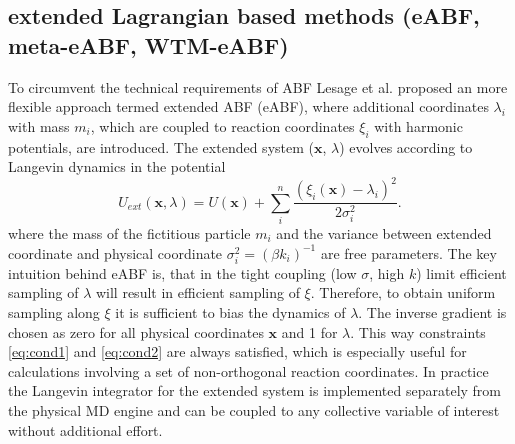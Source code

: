 \newpage
\subsection{extended Lagrangian based methods (eABF, meta-eABF, WTM-eABF)}
\label{sec:eABF}
To circumvent the technical requirements of ABF Lesage et al.\autocite{lesage2017smoothed} proposed an more flexible approach termed extended ABF (eABF), where additional coordinates $\lambda_i$ with mass $m_{i}$, which are coupled to reaction coordinates $\xi_i$ with harmonic potentials, are introduced. The extended system ($\textbf{x}$, $\lambda$) evolves according to Langevin dynamics in the potential
\begin{equation}
  U_{ext}(\textbf{x},\lambda) = U(\textbf{x}) + \sum_i^n \frac{(\xi_{i}(\textbf{x})-\lambda_i)^2}{2\sigma_i^2}.
\end{equation}
where the mass of the fictitious particle $m_i$ and the variance between extended coordinate and physical coordinate $\sigma_i^2=(\beta k_i)^{-1}$ are free parameters.
The key intuition behind eABF is, that in the tight coupling (low $\sigma$, high $k$) limit efficient sampling of $\lambda$ will result in efficient sampling of $\xi$.
Therefore, to obtain uniform sampling along $\xi$ it is sufficient to bias the dynamics of $\lambda$. The inverse gradient is chosen as zero for all physical coordinates $\textbf{x}$ and 1 for $\lambda$.
This way constraints \ref{eq:cond1} and \ref{eq:cond2} are always satisfied, which is especially useful for calculations involving a set of non-orthogonal reaction coordinates.
In practice the Langevin integrator for the extended system is implemented separately from the physical MD engine and can be coupled to any collective variable of interest without additional effort.

